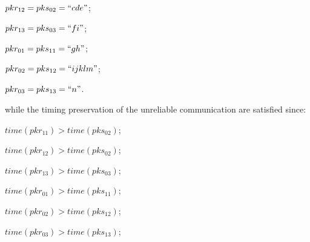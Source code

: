 $pkr_{12} = pks_{02}=``cde"$;

$pkr_{13} = pks_{03}=``fi"$;

$pkr_{01} = pks_{11}=``gh"$;

$pkr_{02} = pks_{12}=``ijklm"$;

$pkr_{03} = pks_{13}=``n"$.

while the timing preservation of the unreliable communication are satisfied since: 

$time(pkr_{11}) > time(pks_{02})$;

$time(pkr_{12}) > time(pks_{02})$; 

$time(pkr_{13}) > time(pks_{03})$;

$time(pkr_{01}) > time(pks_{11})$;

$time(pkr_{02}) > time(pks_{12})$;

$time(pkr_{03}) > time(pks_{13})$;




